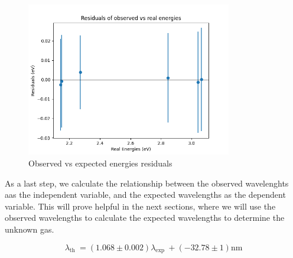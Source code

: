 \begin{figure}
    \centering
    \includegraphics[width=0.8\textwidth]{Results/Sections/Part1/Part1_energy_observed_vs_expected_residuals.png}
    \caption{Observed vs expected energies residuals}
    \label{fig:Part1energyU}
\end{figure}

As a last step, we calculate the relationship between the observed wavelenghts aas the independent variable, and the expected wavelengths as the dependent variable.
This will prove helpful in the next sections, where we will use the observed wavelengths to calculate the expected wavelengths to determine the unknown gas.

\begin{equation}
    \lambda_{\text {th }} = (1.068 \pm 0.002) \lambda_{\text {exp }} + (- 32.78 \pm 1) \text{nm}
\end{equation}


